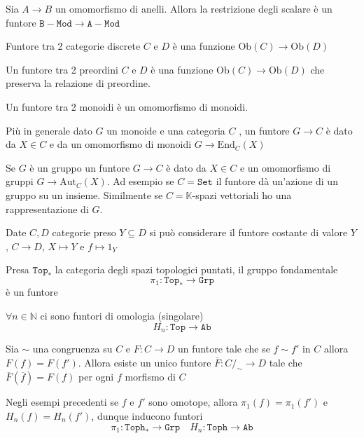 \begin{example}{}
    Sia \(A \to B\) un omomorfismo di anelli. Allora la restrizione degli
    scalare è un funtore \(\mathtt{B-Mod} \to \mathtt{A-Mod}\) 
\end{example}


\begin{example}{}
    Funtore tra 2 categorie discrete \(C\) e \(D\) è una funzione \(\mathrm{Ob}{(C)} \to \mathrm{Ob}{(D)}\) 
\end{example}

\begin{example}{}
    Un funtore tra 2 preordini \(C\) e \(D\) è una funzione \(\mathrm{Ob}{(C)} \to \mathrm{Ob}{(D)}\)  che preserva la relazione di preordine.
\end{example}

\begin{example}{}
    Un funtore tra 2 monoidi è un omomorfismo di monoidi.

    Più in generale dato \(G\)  un monoide e una categoria \(C\) , un funtore \(G \to C\) è dato da \(X \in C\) e da un omomorfismo di monoidi \(G \to \mathrm{End}_C{(X)}\) 

    Se \(G\) è un gruppo un funtore \(G \to C\) è dato da \(X \in C\) e un
    omomorfismo di gruppi \(G \to \mathrm{Aut}_C{(X)}\). Ad esempio se \(C = \mathtt{Set}\) il funtore dà un'azione di un gruppo su un insieme.
    Similmente se \(C = \mathbb{K}\)-spazi vettoriali ho una rappresentazione di
    \(G\).
\end{example}

\begin{example}
    Date \(C, D\) categorie preso \(Y \subseteq D \) si può considerare il
    funtore costante di valore \(Y\), \(C \to D\), \(X \mapsto Y\) e \(f \mapsto 1_Y\) 
\end{example}

\begin{example}{}
    Presa \(\mathtt{Top}_*\) la categoria degli spazi topologici puntati, il
    gruppo fondamentale 
    \[
        \pi_{1} : \mathtt{Top}_* \to \mathtt{Grp}
    \]
    è un funtore
\end{example}

\begin{example}{}
    \(\forall n \in \mathbb{N}\) ci sono funtori di omologia (singolare)
    \[
      H_{n} : \mathtt{Top} \to \mathtt{Ab}
    \]
\end{example}
\begin{theorem}[Omomorfismo]
    Sia \(\sim \) una congruenza su \(C\) e \(F : C \to D\) un funtore tale che
    se \(f \sim f'\) in \(C\) allora \(F{(f)} = F{(f')}\).
    Allora esiste un unico funtore \(\overline{F} : C /_\sim \to D\) tale
    che \(\overline{F}{(\overline{f})} = F{(f)}\) per ogni \(f\) morfismo di \(C\) 
\end{theorem}
\begin{example}{}
    Negli esempi precedenti se \(f\) e \(f'\) sono omotope, allora \(\pi_{1}{(f)} = \pi_{1}{(f')}\) e \(H_{n}{(f)} = H_{n}{(f')}\), dunque inducono funtori
    \[
      \pi_{1} : \mathtt{Toph}_* \to \mathtt{Grp} \quad H_{n} : \mathtt{Toph} \to \mathtt{Ab}
    \]
\end{example}

